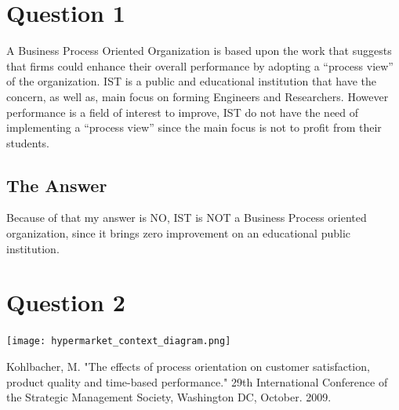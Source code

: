 \documentclass[a4paper,12pt]{texDoc}
\begin{document}
\maketitle %


\section*{Question 1}

A Business Process Oriented Organization \cite{kohlbacher} is based upon the work that suggests that firms could enhance their overall performance by adopting a “process view” of the organization. IST is a public and educational institution that have the concern, as well as, main focus on forming Engineers and Researchers. However performance is a field of interest to improve, IST do not have the need of implementing a “process view” since the main focus is not to profit from their students.

\subsection*{The Answer}

Because of that my answer is NO, IST is NOT a Business Process oriented organization, since it brings zero improvement on an educational public institution.

\section*{Question 2}

\begin{center}
\texttt{[image: hypermarket\_context\_diagram.png]}
\end{center}

\break



\begin{thebibliography}{9}
  Kohlbacher, M. "The effects of process orientation on customer satisfaction, product quality and time-based performance." 29th International Conference of the Strategic Management Society, Washington DC, October. 2009.
\end{thebibliography}

\end{document}
